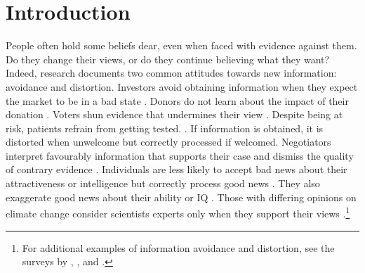 \section{Introduction}\label{sec:intro}

People often hold some beliefs dear, even when faced with evidence against them. Do they change their views, or do they continue believing what they want? Indeed, research documents two common attitudes towards new information: avoidance and distortion. Investors avoid obtaining information when they expect the market to be in a bad state \citep{karlssonOstrichEffectSelective2009,sichermanFinancialAttention2016}. Donors do not learn about the impact of their donation \citep{andreoniAvoidingAskField2017,chanAvoidingPeerInformation2024}. Voters shun evidence that undermines their view \citep{gentzkowWhatDrivesMedia2010,bakshyExposureIdeologicallyDiverse2015}. Despite being at risk, patients refrain from getting tested. \citep{thorntonDemandImpactLearning2008,osterOptimalExpectationsLimited2013}. If information is obtained, it is distorted when unwelcome but correctly processed if welcomed. Negotiators interpret favourably information that supports their case and dismiss the quality of contrary evidence \citep{babcockBiasedJudgmentsFairness1995}. Individuals are less likely to accept bad news about their attractiveness or intelligence but correctly process good news \citep{eilGoodNewsbadNews2011}. They also exaggerate good news about their ability or IQ \citep{mobiusManagingSelfConfidenceTheory2022,drobnerMotivatedBeliefUpdating2024}. Those with differing opinions on climate change consider scientists experts only when they support their views \citep{kahanPolarizingImpactScience2012}.\footnote{For additional examples of information avoidance and distortion, see the surveys by \cite{danielOverconfidentInvestorsPredictable2015}, \cite{benabou2016mindful}, and \cite{golmanInformationAvoidance2017}.}

